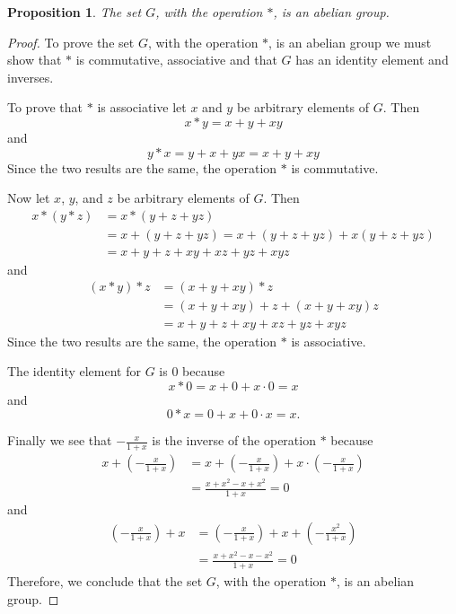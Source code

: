 \documentclass[12pt]{article}   %
\newtheorem*{proposition}{Proposition}  %
\begin{document}
\begin{proposition}
The set $G$, with the operation $\ast$, is an abelian group.
\end{proposition}
\begin{proof}
To prove the set $G$, with the operation $\ast$, is an abelian group we must show that $\ast$ is commutative, associative and that $G$ has an identity element and inverses.

To prove that $*$ is associative let $x$ and $y$ be arbitrary elements of $G$. Then
\begin{equation*}
x * y = x + y + xy
\end{equation*}
and
\begin{equation*}
y * x = y + x + yx = x + y + xy
\end{equation*}
Since the two results are the same, the operation $\ast$ is commutative.

Now let $x$, $y$, and $z$ be arbitrary elements of $G$. Then
\begin{align*}
x * (y * z) &= x * (y + z + yz) \\
&= x + (y + z + yz) = x + (y + z + yz) + x(y + z +yz) \\
&= x + y + z + xy + xz + yz + xyz
\end{align*}
and
\begin{align*}
(x * y) * z &= (x + y + xy) * z \\
&= (x + y + xy) + z + (x + y + xy)z \\
&= x + y + z + xy + xz + yz + xyz
\end{align*}
Since the two results are the same, the operation $*$ is associative.

The identity element for $G$ is $0$ because
\begin{equation*}
x * 0 = x + 0 + x \cdot 0 = x
\end{equation*}
and
\begin{equation*}
0 * x = 0 + x + 0 \cdot x = x.
\end{equation*}

Finally we see that $-\frac{x}{1+x}$ is the inverse of the operation $\ast$ because
\begin{align*}
x + \left( -\frac{x}{1+x} \right) &= x + \left( - \frac{x}{1+x} \right) + x \cdot  \left( - \frac{x}{1+x} \right) \\
&= \frac{x + x^2 - x + x^2}{1 + x} = 0
\end{align*}
and
\begin{align*}
\left( -\frac{x}{1+x} \right) + x &= \left( -\frac{x}{1+x} \right) + x + \left( -\frac{x^2}{1+x} \right) \\
&= \frac{x + x^2 - x - x^2}{1 + x} = 0
\end{align*}
Therefore, we conclude that the set $G$, with the operation $\ast$, is an abelian group.

\end{proof}
\end{document}
